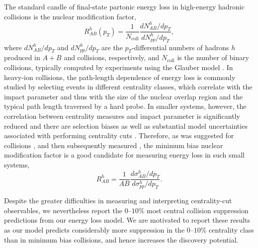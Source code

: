 \documentclass[%
 reprint,
 amsmath,amssymb,
 aps,
 prl,nofootinbib,
 superscriptaddress
]{revtex4-2}
\begin{document}
 The standard candle of final-state partonic energy loss in high-energy hadronic collisions is the nuclear modification factor,
\begin{equation}
	R^h_{AB}(p_T) = \frac{1}{N_{\text{coll}}} \frac{dN^h_{AB} / d p_T}{dN^h_{pp} / d p_T},
	\label{eqn:}
\end{equation}
where $dN^h_{AB} / dp_T$ and $dN^h_{pp} / d p_T$ are the $p_T$-differential numbers of hadrons $h$ produced in $A + B$ and \pp{} collisions, respectively, and $N_{\text{coll}}$ is the number of binary collisions, typically computed by experiments using the Glauber model \cite{Glauber:1970jm,Miller:2007ri}. 
In heavy-ion collisions, the path-length dependence of energy loss is commonly studied by selecting events in different centrality classes, which correlate with the impact parameter and thus with the size of the nuclear overlap region and the typical path length traversed by a hard probe.
In smaller systems, however, the correlation between centrality measures and impact parameter is significantly reduced and there are selection biases as well as substantial model uncertainties associated with performing centrality cuts \cite{ALICE:2014xsp}. Therefore, as was suggested for \oo{} collisions \cite{Huss:2020dwe,Huss:2020whe}, and then subsequently measured \cite{CMS:2025bta}, the minimum bias nuclear modification factor is a good candidate for measuring energy loss in such small systems,
\begin{equation}
	R^h_{AB} = \frac{1}{AB} \frac{d\sigma^h_{AB} / d p_T}{d\sigma^h_{pp} / d p_T}.
	\label{eqn:min_bias_raa}
\end{equation}

Despite the greater difficulties in measuring and interpreting centrality-cut observables, we nevertheless report the $0\text{--}10\%$ most central collision suppression predictions from our energy loss model. 
We are motivated to report these results as our model predicts considerably more suppression in the $0\text{--}10\%$ centrality class than in minimum bias collisions, and hence increases the discovery potential.
\end{document}
